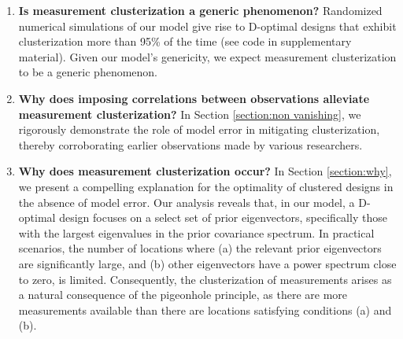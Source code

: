 \begin{enumerate}

\item \label{q:generic} \textbf{Is measurement clusterization a
  generic phenomenon?}
  Randomized numerical simulations of our model give rise to D-optimal
  designs that exhibit clusterization more than 95\% of the time (see
  code in supplementary material). Given our model's genericity, we
  expect measurement clusterization to be a generic phenomenon.

\item \label{q:mitigate} \textbf{Why does imposing correlations
  between observations alleviate measurement clusterization?} In
  Section \ref{section:non vanishing}, we rigorously demonstrate the
  role of model error in mitigating clusterization, thereby
  corroborating earlier observations made by various researchers.

\item \label{q:why} \textbf{Why does measurement clusterization
  occur?} In Section \ref{section:why}, we present a compelling
  explanation for the optimality of clustered designs in the absence
  of model error. Our analysis reveals that, in our model, a D-optimal
  design focuses on a select set of prior eigenvectors, specifically
  those with the largest eigenvalues in the prior covariance
  spectrum. In practical scenarios, the number of locations where (a)
  the relevant prior eigenvectors are significantly large, and (b)
  other eigenvectors have a power spectrum close to zero, is
  limited. Consequently, the clusterization of measurements arises as
  a natural consequence of the pigeonhole principle, as there are more
  measurements available than there are locations satisfying
  conditions (a) and (b).




\end{enumerate}
